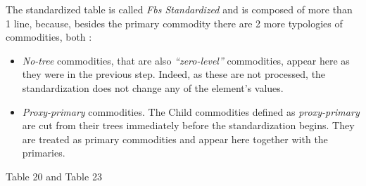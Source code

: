 \documentclass[]{article}
\providecommand{\tightlist}{%
  \setlength{\itemsep}{0pt}\setlength{\parskip}{0pt}}
\begin{document}
The standardized table is called \emph{Fbs Standardized} and is composed
of more than 1 line, because, besides the primary commodity there are 2
more typologies of commodities, both :

\begin{itemize}
\tightlist
\item
  \emph{No-tree} commodities, that are also \emph{``zero-level''}
  commodities, appear here as they were in the previous step. Indeed, as
  these are not processed, the standardization does not change any of
  the element's values.
\item
  \emph{Proxy-primary} commodities. The Child commodities defined as
  \emph{proxy-primary} are cut from their trees immediately before the
  standardization begins. They are treated as primary commodities and
  appear here together with the primaries.
\end{itemize}

Table 20 and Table 23
\end{document}
